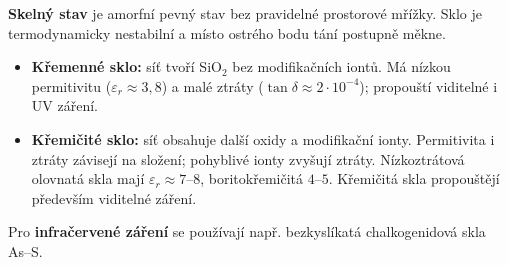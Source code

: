 \textbf{Skelný stav} je amorfní pevný stav bez pravidelné prostorové mřížky. Sklo je termodynamicky nestabilní a místo ostrého bodu tání postupně měkne.
\begin{itemize}
\item \textbf{Křemenné sklo:} síť tvoří SiO$_2$ bez modifikačních iontů. Má nízkou permitivitu ($\varepsilon_r\approx3{,}8$) a malé ztráty ($\tan\delta\approx2\cdot10^{-4}$); propouští viditelné i UV záření.
\item \textbf{Křemičité sklo:} síť obsahuje další oxidy a modifikační ionty. Permitivita i ztráty závisejí na složení; pohyblivé ionty zvyšují ztráty. Nízkoztrátová olovnatá skla mají $\varepsilon_r\approx7$--$8$, boritokřemičitá $4$--$5$. Křemičitá skla propouštějí především viditelné záření.
\end{itemize}
Pro \textbf{infračervené záření} se používají např. bezkyslíkatá chalkogenidová skla As--S.
